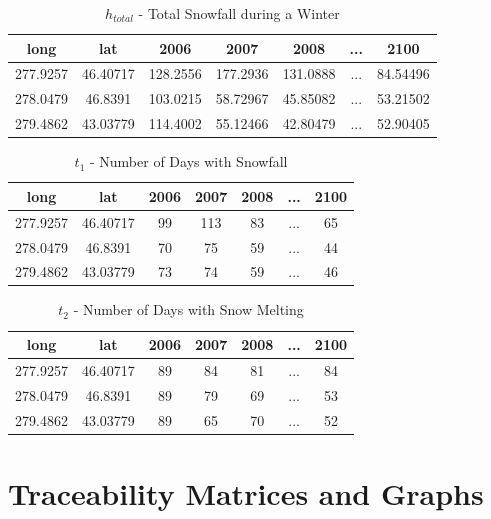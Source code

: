 \documentclass[12pt]{article}
\begin{document}
\begin{table}[H]
\centering
\begin{tabular}{|c|c|c|c|c|c|c|}
\hline 
 long & lat & 2006 & 2007 & 2008 & ... & 2100  \\

\hline
277.9257 & 46.40717 & 128.2556 & 177.2936 & 131.0888 & ... & 84.54496\\ \hline
278.0479 & 46.8391 & 103.0215 & 58.72967 & 45.85082 & ... & 53.21502 \\ \hline
279.4862 & 43.03779 & 114.4002  & 55.12466 & 42.80479 & ... & 52.90405\\ \hline
\end{tabular}
\caption{$h_{total}$ - Total Snowfall during a Winter}
\label{Table:htotal}
\end{table}


\begin{table}[H]
\centering
\begin{tabular}{|c|c|c|c|c|c|c|}
\hline 
 long & lat & 2006 & 2007 & 2008 & ... & 2100  \\

\hline
277.9257 & 46.40717 & 99 & 113 & 83 & ... & 65\\ \hline
278.0479 & 46.8391 & 70 & 75 & 59 & ... & 44 \\ \hline
279.4862 & 43.03779 & 73  & 74 & 59 & ... & 46\\ \hline
\end{tabular}
\caption{$t_1$ - Number of Days with Snowfall}
\label{Table:t1}
\end{table}

\begin{table}[H]
\centering
\begin{tabular}{|c|c|c|c|c|c|c|}
\hline 
 long & lat & 2006 & 2007 & 2008 & ... & 2100  \\

\hline
277.9257 & 46.40717 & 89 & 84 & 81 & ... & 84\\ \hline
278.0479 & 46.8391 & 89 & 79 & 69 & ... & 53 \\ \hline
279.4862 & 43.03779 & 89  & 65 & 70 & ... & 52\\ \hline
\end{tabular}
\caption{$t_2 $ - Number of Days with Snow Melting}
\label{Table:t2}
\end{table}

\section{Traceability Matrices and Graphs}
\end{document}
